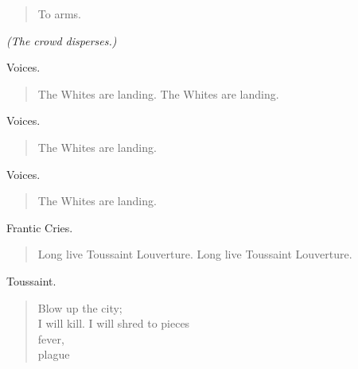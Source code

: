 \documentclass[letterpaper,article,12pt,oneside,notitlepage]{memoir}
\begin{document}
\begin{verse}
\hspace{1cm} To arms.  \\
\end{verse}

\textit{(The crowd disperses.)}

\begin{center}Voices.\end{center}

\begin{verse}
\hspace{1cm} The Whites are landing. The Whites are landing. \\
\end{verse}

\begin{center}Voices.\end{center}

\begin{verse}
\hspace{1cm} The Whites are landing. \\
\end{verse}

\begin{center}Voices.\end{center}

\begin{verse}
\hspace{1cm} The Whites are landing. \\
\end{verse}

\begin{center}Frantic Cries.\end{center}

\begin{verse}
\hspace{1cm} Long live Toussaint Louverture. Long live Toussaint Louverture. \\
\end{verse}

\begin{center}Toussaint.\end{center}

\begin{verse}
Blow up the city; \\
I will kill. I will shred to pieces \\
fever, \\
plague \\
\end{verse}
\end{document}
